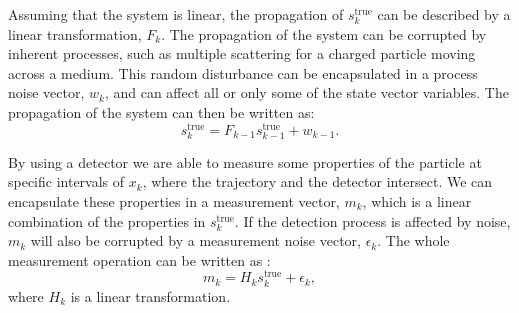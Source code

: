 Assuming that the system is linear, the propagation of $s_k^{\textrm{true}}$ can be described by a linear transformation, $F_{k}$. The propagation of the system can be corrupted by inherent processes, such as multiple scattering for a charged particle moving across a medium. This random disturbance can be encapsulated in a process noise vector, $w_k$, and can affect all or only some of the state vector variables. The propagation of the system can then be written as:
\begin{equation} \label{eq:ev}
     s_k^{\textrm{true}} = F_{k-1}s_{k-1}^{\textrm{true}}+w_{k-1}.
\end{equation}

By using a detector we are able to measure some properties of the particle at specific intervals of $x_k$, where the trajectory and the detector intersect. We can encapsulate these properties in a measurement vector,  $m_k$, which is a linear combination of the properties in $s_k^{\textrm{true}}$. If the detection process is affected by noise, $m_k$ will also be corrupted by a measurement noise vector, $\epsilon_k$. The whole measurement operation can be written as :
\begin{equation}
    m_k = H_k s_k^{\textrm{true}} + \epsilon_k,
\end{equation}
where $H_k$ is a linear transformation. 

